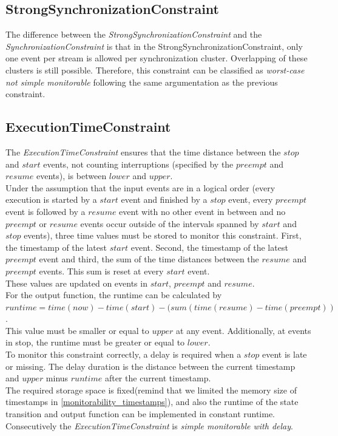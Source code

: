 	
\subsection{StrongSynchronizationConstraint}
	The difference between the \emph{StrongSynchronizationConstraint} and the \emph{SynchronizationConstraint} is that in the StrongSynchronizationConstraint, only one event per stream is allowed per synchronization cluster. Overlapping of these clusters is still possible. Therefore, this constraint can be classified as \textit{worst-case not simple monitorable} following the same argumentation as the previous constraint.
	
	
\subsection{ExecutionTimeConstraint}
	The \emph{ExecutionTimeConstraint} ensures that the time distance between the $stop$ and $start$ events, not counting interruptions (specified by the $preempt$ and $resume$ events), is between $lower$ and $upper$.\\
	Under the assumption that the input events are in a logical order (every execution is started by a $start$ event and finished by a $stop$ event, every $preempt$ event is followed by a $resume$ event with no other event in between and no $preempt$ or $resume$ events occur outside of the intervals spanned by $start$ and $stop$ events), three time values must be stored to monitor this constraint. First, the timestamp of the latest $start$ event. Second, the timestamp of the latest $preempt$ event and third, the sum of the time distances between the $resume$ and $preempt$ events. This sum is reset at every $start$ event.\\
	These values are updated on events in $start$, $preempt$ and $resume$.\\
	For the output function, the runtime can be calculated by\\ $runtime = time(now) - time(start) - (sum(time(resume) - time(preempt))$.\\ 
	This value must be smaller or equal to $upper$ at any event. Additionally, at events in stop, the runtime must be greater or equal to $lower$.\\
	To monitor this constraint correctly, a delay is required when a $stop$ event is late or missing. The delay duration is the distance between the current timestamp and $upper$ minus $runtime$ after the current timestamp.\\
	The required storage space is fixed(remind that we limited the memory size of timestamps in \ref{monitorability_timestamps}), and also the runtime of the state transition and output function can be implemented in constant runtime. Consecutively the \emph{ExecutionTimeConstraint} is \textit{simple monitorable with delay}.


